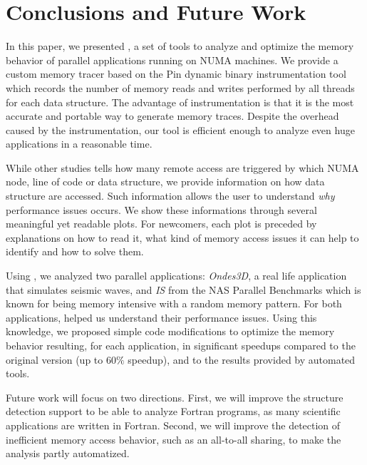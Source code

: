 
\section{Conclusions and Future Work}
\label{sec:concl}

In this paper, we presented \TABARNAC, a set of tools to analyze and
optimize the memory behavior of parallel applications running on NUMA
machines. We provide a custom memory tracer
based on the Pin dynamic binary instrumentation tool which records the
number of memory reads and writes performed by all threads for each data structure.
The advantage of instrumentation is that it is the most
accurate and portable way to generate memory traces.
Despite the overhead caused by the instrumentation, our tool is efficient enough to analyze even huge applications in a reasonable time.

While other studies tells how many remote access are triggered by which NUMA
node, line of code or data structure, we provide information on how data
structure are accessed. Such information allows the user to understand
\emph{why} performance issues occurs. We show these informations through
several  meaningful yet readable plots. For newcomers, each plot is preceded by explanations
on how to read it, what kind of memory access issues it can help to identify
and how to solve them.

Using \TABARNAC, we analyzed two parallel applications: \emph{Ondes3D}, a real life application that
simulates seismic waves, and \emph{IS} from the NAS
Parallel Benchmarks which is known for being memory intensive with a random
memory pattern. For both applications, \TABARNAC helped us
understand their performance issues.  Using this knowledge, we proposed
simple code modifications to optimize the memory behavior resulting, for each
application, in significant speedups compared to the original version (up to
$60\%$ speedup), and to the results provided by automated tools.

Future work will focus on two directions. First, we will improve the
structure detection support to be able to analyze Fortran programs, as many
scientific applications are written in Fortran. Second, we will improve the
detection of inefficient memory access behavior, such as an all-to-all
sharing, to make the analysis partly automatized.
